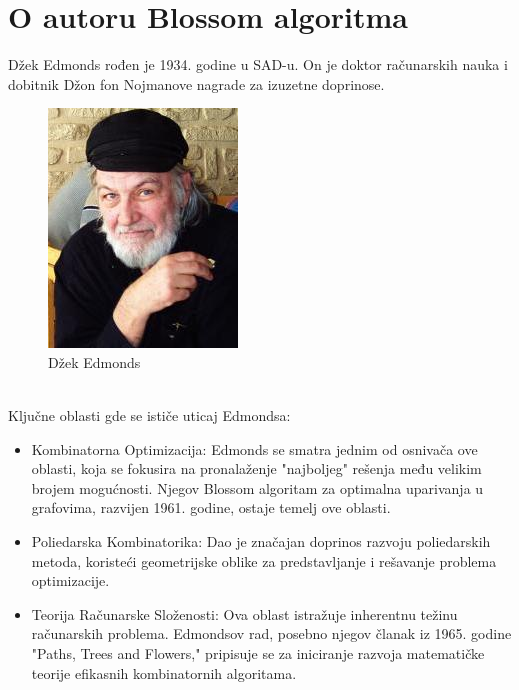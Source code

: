 \documentclass[a4paper]{article}
\theoremstyle{definition}
\begin{document}
\section{O autoru Blossom algoritma}
Džek Edmonds rođen je 1934. godine u SAD-u. On je doktor računarskih nauka i dobitnik Džon fon Nojmanove nagrade za izuzetne doprinose.
\begin{figure}[ht]
\begin{center}
\includegraphics[scale=0.4]{jack_edmonds.jpg}
\end{center}
\caption{Džek Edmonds}
\label{fig:slika 6}
\end{figure}
\\Ključne oblasti gde se ističe uticaj Edmondsa:
\begin{itemize}
\item Kombinatorna Optimizacija: Edmonds se smatra jednim od osnivača ove oblasti, koja se fokusira na pronalaženje "najboljeg" rešenja među velikim brojem mogućnosti. Njegov Blossom algoritam za optimalna uparivanja u grafovima, razvijen 1961. godine, ostaje temelj ove oblasti.

\item Poliedarska Kombinatorika: Dao je značajan doprinos razvoju poliedarskih metoda, koristeći geometrijske oblike za predstavljanje i rešavanje problema optimizacije.

\item  Teorija Računarske Složenosti: Ova oblast istražuje inherentnu težinu računarskih problema. Edmondsov rad, posebno njegov članak iz 1965. godine "Paths, Trees and Flowers," pripisuje se za iniciranje razvoja matematičke teorije efikasnih kombinatornih algoritama.
\end{itemize}
\end{document}
